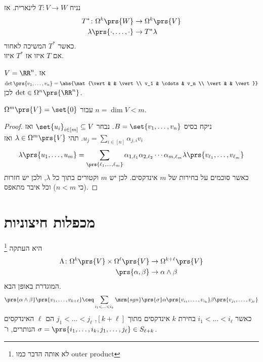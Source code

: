 \documentclass[a4paper,10pt,twoside,openany]{book}
\begin{document}
נניח
$T \colon V \to W$
לינארית. אז
\begin{align*}
T^* \colon \Omega^k\prs{W} &\to \Omega^k\prs{V} \\
\lambda\prs{\cdot, \ldots, \cdot} &\to T^* \lambda
\end{align*}
כאשר
$T^*$
המשיכה לאחור.
\\
אם
$T$
איזו אז
$T^*$
איזו.

\begin{example}
$V = \RR^n$.
אז
$\det \prs{v_1, \ldots, v_n} = \abs{\mat{\vert & & \vert \\ v_1 & \cdots & v_n \\ \vert & & \vert}}$
לכן
$\det \in \Omega^n\prs{\RR^n}$.
\end{example}
\begin{proposition}
$\Omega^m \prs{V} = \set{0}$
עבור
$n = \dim V < m$.
\end{proposition}
\begin{proof}
ניקח בסיס
$B = \set{v_1, \ldots, v_n}$.
נבחר
$\set{u_i}_{i\in [m]} \subseteq V$
ואז
$u_j = \sum_{i\in [n]} \alpha_{j,i} v_i$.
תהי
$\lambda \in \Omega^m \prs{V}$
ואז
\[\lambda\prs{u_1, \ldots, u_m} = \sum_{\prs{\ell_1, \ldots, \ell_m}} \alpha_{1,\ell_1} \alpha_{2,\ell_2} \cdots \alpha_{m,\ell_m} \lambda\prs{v_{\ell_1}, \ldots, v_{\ell_m}}\]
כאשר סוכמים על בחירות של
$m$
אינדקסים.
לכן יש
$m$
וקטורים בתוך כל
$\lambda$,
ולכן יש חזרות (כי
$n < m$)
וכל איבר מתאפס.
\end{proof}
\section{מכפלות חיצוניות}
\begin{definition}
\footnote{לא אותה הדבר כמו
\textenglish{outer product}}
היא העתקה
\begin{align*}
\Lambda \colon \Omega^k\prs{V} \times \Omega^{\ell}\prs{V} &\to \Omega^{k+\ell}\prs{V} \\
\prs{\alpha, \beta} &\to \alpha \wedge \beta
\end{align*}
המוגדרת באופן הבא.
\begin{align*}
\prs{\alpha \wedge \beta}\prs{v_1,\ldots, v_{k+\ell}} \ceq  \sum_{i_1 < \ldots < i_k} \mrm{sgn}\prs{\sigma} \alpha\prs{v_{i_1}, \ldots, v_{i_k}} \beta\prs{v_{j_1}, \ldots, v_{j_{\ell}}}
\end{align*}
כאשר
$i_1 < \ldots < i_{\ell}$
בחירת
$k$
אינדקסים מתוך
$[k+\ell]$,
$j_1 < \ldots < j_{\ell}$
הם
$\ell$
האינדקסים הנותרים, ו־%
$\sigma = \prs{i_1, \ldots, i_k, j_1, \ldots, j_{\ell}} \in S_{\ell+k}$.
\end{definition}
\end{document}
